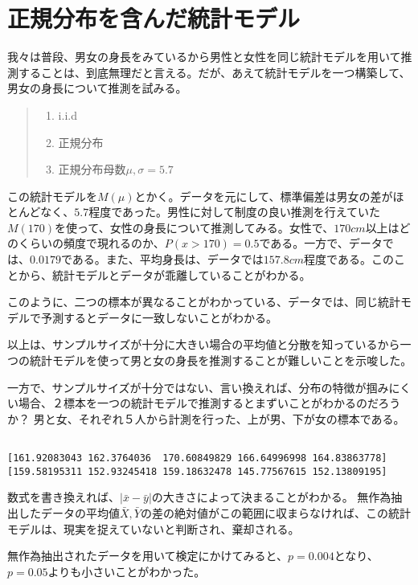 





\section{正規分布を含んだ統計モデル}
我々は普段、男女の身長をみているから男性と女性を同じ統計モデルを用いて推測することは、到底無理だと言える。だが、あえて統計モデルを一つ構築して、男女の身長について推測を試みる。
\begin{quote}
    \begin{enumerate}[(1)]
\item i.i.d
\item 正規分布
\item 正規分布母数$\mu,\sigma=5.7$
\end{enumerate}
\end{quote}
この統計モデルを$M(\mu)$とかく。データを元にして、標準偏差は男女の差がほとんどなく、$5.7$程度であった。男性に対して制度の良い推測を行えていた$M(170)$を使って、女性の身長について推測してみる。女性で、$170cm$以上はどのくらいの頻度で現れるのか、$P(x>170)=0.5$である。一方で、データでは、$0.0179$である。また、平均身長は、データでは$157.8cm$程度である。このことから、統計モデルとデータが乖離していることがわかる。

\fi
{}
このように、二つの標本が異なることがわかっている、データでは、同じ統計モデルで予測するとデータに一致しないことがわかる。
\fi

以上は、サンプルサイズが十分に大きい場合の平均値と分散を知っているから一つの統計モデルを使って男と女の身長を推測することが難しいことを示唆した。


一方で、サンプルサイズが十分ではない、言い換えれば、分布の特徴が掴みにくい場合、２標本を一つの統計モデルで推測するとまずいことがわかるのだろうか？
男と女、それぞれ５人から計測を行った、上が男、下が女の標本である。
\begin{lstlisting}

[161.92083043 162.3764036  170.60849829 166.64996998 164.83863778]
[159.58195311 152.93245418 159.18632478 145.77567615 152.13809195]
\end{lstlisting}



数式を書き換えれば、$|\bar{x}-\bar{y}|$の大きさによって決まることがわかる。
無作為抽出したデータの平均値$\bar{X},\bar{Y}$の差の絶対値がこの範囲に収まらなければ、この統計モデルは、現実を捉えていないと判断され、棄却される。

無作為抽出されたデータを用いて検定にかけてみると、$p=0.004$となり、$p=0.05$よりも小さいことがわかった。

\fi